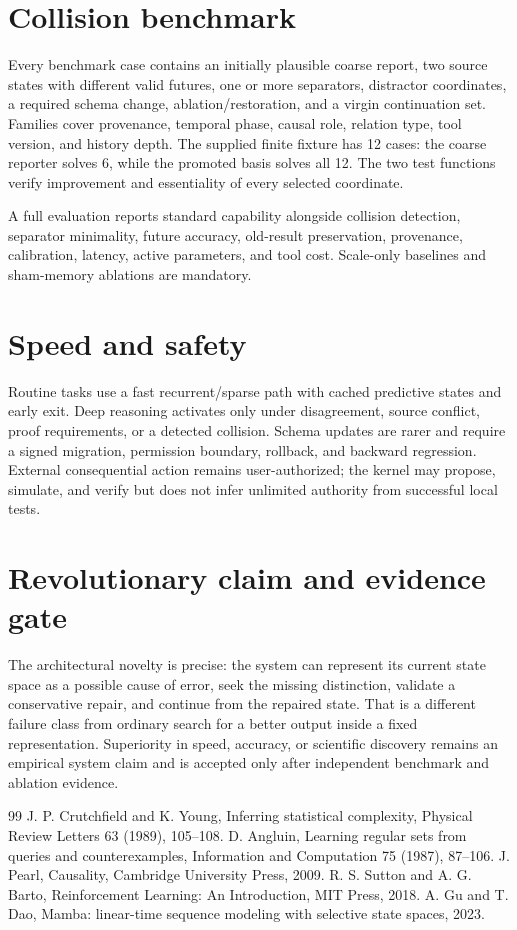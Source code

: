 \documentclass[11pt,a4paper]{article}
\begin{document}
\section{Collision benchmark}
Every benchmark case contains an initially plausible coarse report, two source states with different valid futures, one or more separators, distractor coordinates, a required schema change, ablation/restoration, and a virgin continuation set. Families cover provenance, temporal phase, causal role, relation type, tool version, and history depth. The supplied finite fixture has 12 cases: the coarse reporter solves 6, while the promoted basis solves all 12. The two test functions verify improvement and essentiality of every selected coordinate.

A full evaluation reports standard capability alongside collision detection, separator minimality, future accuracy, old-result preservation, provenance, calibration, latency, active parameters, and tool cost. Scale-only baselines and sham-memory ablations are mandatory.

\section{Speed and safety}
Routine tasks use a fast recurrent/sparse path with cached predictive states and early exit. Deep reasoning activates only under disagreement, source conflict, proof requirements, or a detected collision. Schema updates are rarer and require a signed migration, permission boundary, rollback, and backward regression. External consequential action remains user-authorized; the kernel may propose, simulate, and verify but does not infer unlimited authority from successful local tests.

\section{Revolutionary claim and evidence gate}
The architectural novelty is precise: the system can represent its current state space as a possible cause of error, seek the missing distinction, validate a conservative repair, and continue from the repaired state. That is a different failure class from ordinary search for a better output inside a fixed representation. Superiority in speed, accuracy, or scientific discovery remains an empirical system claim and is accepted only after independent benchmark and ablation evidence.

\begin{thebibliography}{99}
 J. P. Crutchfield and K. Young, Inferring statistical complexity, Physical Review Letters 63 (1989), 105--108.
 D. Angluin, Learning regular sets from queries and counterexamples, Information and Computation 75 (1987), 87--106.
 J. Pearl, Causality, Cambridge University Press, 2009.
 R. S. Sutton and A. G. Barto, Reinforcement Learning: An Introduction, MIT Press, 2018.
 A. Gu and T. Dao, Mamba: linear-time sequence modeling with selective state spaces, 2023.
\end{thebibliography}
\end{document}
